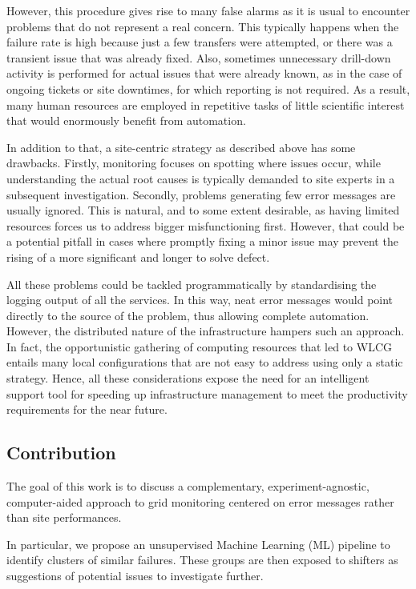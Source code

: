 However, this procedure gives rise to many false alarms as it is usual to encounter problems that do not represent a real concern. This typically happens when the failure rate is high because just a few transfers were attempted, or there was a transient issue that was already fixed. 
Also, sometimes unnecessary drill-down activity is performed for actual issues that were already known, as in the case of ongoing tickets or site downtimes, for which reporting is not required.
As a result, many human resources are employed in repetitive tasks of little scientific interest that would enormously benefit from automation. 

In addition to that, a site-centric strategy as described above has some drawbacks. Firstly, monitoring focuses on spotting where issues occur, while understanding the actual root causes is typically demanded to site experts in a subsequent investigation.
Secondly, problems generating few error messages are usually ignored. This is natural, and to some extent desirable, as having limited resources forces us to address bigger misfunctioning first. However, that could be a potential pitfall in cases where promptly fixing a minor issue may prevent the rising of a more significant and longer to solve defect.

All these problems could be tackled programmatically by standardising the logging output of all the services. In this way, neat error messages would point directly to the source of the problem, thus allowing complete automation. 
However, the distributed nature of the infrastructure hampers such an approach.
In fact, the opportunistic gathering of computing resources that led to WLCG entails many local configurations that are not easy to address using only a static strategy.
Hence, all these considerations expose the need for an intelligent support tool for speeding up infrastructure management to meet the productivity requirements for the near future.


\subsection{Contribution}
The goal of this work is to discuss a complementary, experiment-agnostic, computer-aided approach to grid monitoring centered on error messages rather than site performances.

In particular, we propose an unsupervised Machine Learning (ML) pipeline to identify clusters of similar failures. These groups are then exposed to shifters as suggestions of potential issues to investigate further.